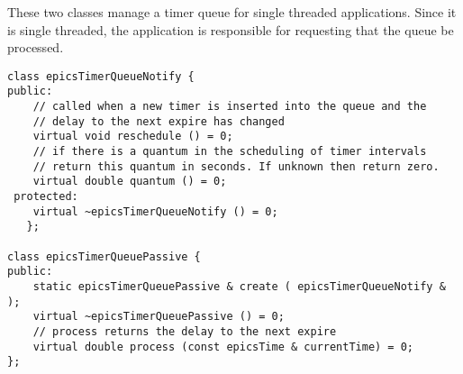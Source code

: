 These two classes manage a timer queue for single threaded applications. Since it is single threaded, the application is 
responsible for requesting that the queue be processed.

\begin{verbatim}
class epicsTimerQueueNotify {
public:
    // called when a new timer is inserted into the queue and the
    // delay to the next expire has changed
    virtual void reschedule () = 0;
    // if there is a quantum in the scheduling of timer intervals
    // return this quantum in seconds. If unknown then return zero.
    virtual double quantum () = 0;
 protected:
    virtual ~epicsTimerQueueNotify () = 0;
   };

class epicsTimerQueuePassive {
public:
    static epicsTimerQueuePassive & create ( epicsTimerQueueNotify & );
    virtual ~epicsTimerQueuePassive () = 0;
    // process returns the delay to the next expire
    virtual double process (const epicsTime & currentTime) = 0;
};
\end{verbatim}


